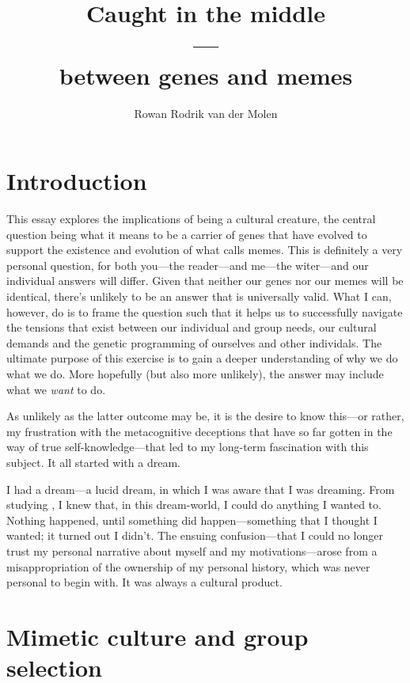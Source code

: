 \documentclass{article}
\title{Caught in the middle\\---\\between genes and memes}
\author{Rowan Rodrik van der Molen}
\begin{document}
\maketitle

\tableofcontents

\section{Introduction}
\label{sec:intro}

This essay explores the implications of being a cultural creature, the central
question being what it means to be a carrier of genes that have evolved to support
the existence and evolution of what \citet{dawkins1976} calls memes. This is
definitely a very personal question, for both you---the reader---and me---the
witer---and our individual answers will differ. Given that neither our genes
nor our memes will be identical, there's unlikely to be an answer that
is universally valid. What I can, however, do is to frame the question such
that it helps us to successfully navigate the tensions that exist between our
individual and group needs, our cultural demands and the genetic programming of
ourselves and other individals. The ultimate purpose of this exercise is to
gain a deeper understanding of why we do what we do. More hopefully (but also
more unlikely), the answer may include what we \emph{want} to do.

As unlikely as the latter outcome may be, it is the desire to know this---or
rather, my frustration with the metacognitive deceptions that have so far
gotten in the way of true self-knowledge---that led to my long-term fascination
with this subject. It all started with a dream.

I had a dream---a lucid dream, in which I was aware that I was dreaming. From
studying \citet{laberge1990}, I knew that, in this dream-world, I could do
anything I wanted to. Nothing happened, until something did happen---something
that I thought I wanted; it turned out I didn't. The ensuing confusion---that I
could no longer trust my personal narrative about myself and my
motivations---arose from a misappropriation of the ownership of my personal
history, which was never personal to begin with. It was always a cultural
product.

\section{Mimetic culture and group selection}
\label{sec:mimesis}
\end{document}
